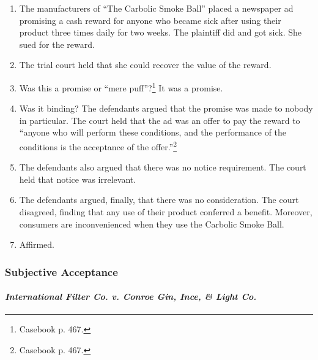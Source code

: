 \begin{enumerate}
    \item The manufacturers of ``The Carbolic Smoke Ball'' placed a newspaper 
    ad promising a cash reward for anyone who became sick after using their 
    product three times daily for two weeks. The plaintiff did and got sick. 
    She sued for the reward.
    \item The trial court held that she could recover the value of the reward.
    \item Was this a promise or ``mere puff''?\footnote{Casebook p. 467.} It 
    was a promise.
    \item Was it binding? The defendants argued that the promise was made to 
    nobody in particular. The court held that the ad was an offer to pay the 
    reward to ``anyone who will perform these conditions, and the performance 
    of the conditions is the acceptance of the offer.''\footnote{Casebook p. 
    467.}
    \item The defendants also argued that there was no notice requirement. The 
    court held that notice was irrelevant.
    \item The defendants argued, finally, that there was no consideration. The 
    court disagreed, finding that any use of their product conferred a 
    benefit. Moreover, consumers are inconvenienced when they use the Carbolic 
    Smoke Ball.
    \item Affirmed.
\end{enumerate}

\subsubsection{Subjective Acceptance}

\paragraph{\emph{International Filter Co. v. Conroe Gin, Ince, \& Light Co.}}

